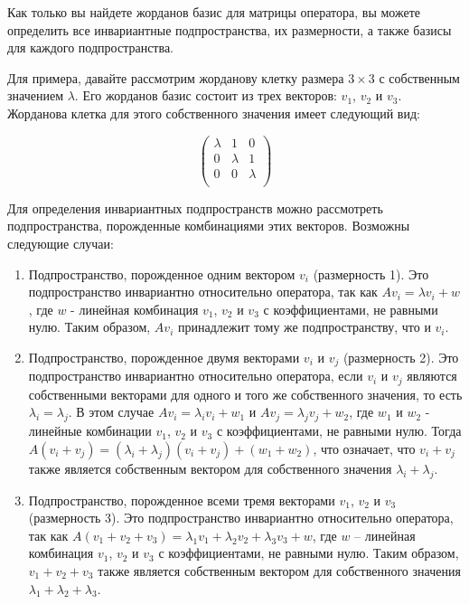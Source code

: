 Как только вы найдете жорданов базис для матрицы оператора, вы можете определить все инвариантные подпространства, их
размерности, а также базисы для каждого подпространства.

Для примера, давайте рассмотрим жорданову клетку размера $3 \times 3$ с собственным значением $\lambda$.
Его жорданов базис состоит из трех векторов: $v_1$, $v_2$ и $v_3$.
Жорданова клетка для этого собственного значения имеет следующий вид:

\[
    \begin{pmatrix}
        \lambda & 1       & 0       \\
        0       & \lambda & 1       \\
        0       & 0       & \lambda \\
    \end{pmatrix}
\]

Для определения инвариантных подпространств можно рассмотреть подпространства, порожденные комбинациями этих
векторов.
Возможны следующие случаи:
\begin{enumerate}
    \item Подпространство, порожденное одним вектором $v_i$ (размерность 1).
    Это подпространство инвариантно относительно оператора, так как $Av_i = \lambda v_i + w$, где $w$ - линейная
    комбинация $v_1$, $v_2$ и $v_3$ с коэффициентами, не равными нулю.
    Таким образом, $Av_i$ принадлежит тому же подпространству, что и $v_i$.
    \item Подпространство, порожденное двумя векторами $v_i$ и $v_j$ (размерность 2).
    Это подпространство инвариантно
    относительно оператора, если $v_i$ и $v_j$ являются собственными векторами для одного и того же собственного
    значения, то есть $\lambda_i = \lambda_j$.
    В этом случае $Av_i = \lambda_i v_i + w_1$ и $Av_j = \lambda_j v_j + w_2$, где $w_1$ и $w_2$ - линейные
    комбинации $v_1$, $v_2$ и $v_3$ с коэффициентами, не равными нулю.
    Тогда $A(v_i + v_j) = (\lambda_i + \lambda_j)(v_i + v_j) + (w_1 + w_2)$, что означает, что $v_i + v_j$ также
    является собственным вектором для собственного значения $\lambda_i + \lambda_j$.
    \item Подпространство, порожденное всеми тремя векторами $v_1$, $v_2$ и $v_3$ (размерность 3).
    Это подпространство
    инвариантно относительно оператора, так как $A(v_1 + v_2 + v_3) = \lambda_1 v_1 + \lambda_2 v_2 + \lambda_3 v_3 +
    w$, где $w$ -- линейная комбинация $v_1$, $v_2$ и $v_3$ с коэффициентами, не равными нулю.
    Таким образом, $v_1 + v_2 + v_3$ также является собственным вектором для собственного значения $\lambda_1 + \lambda_2 + \lambda_3$.
\end{enumerate}

